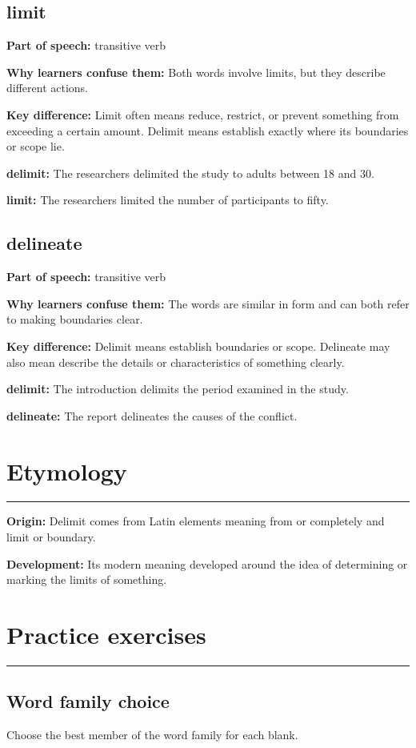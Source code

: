 \documentclass[11pt]{article}
\newcommand{\sectionrule}{\par\vspace{-0.5em}\noindent\textcolor{Accent}{\rule{\linewidth}{0.6pt}}\par}
\begin{document}
\subsection{limit}
\textbf{Part of speech:} transitive verb

\textbf{Why learners confuse them:} Both words involve limits, but they describe different actions.

\textbf{Key difference:} Limit often means reduce, restrict, or prevent something from exceeding a certain amount. Delimit means establish exactly where its boundaries or scope lie.

\textbf{delimit:} The researchers delimited the study to adults between 18 and 30.

\textbf{limit:} The researchers limited the number of participants to fifty.

\subsection{delineate}
\textbf{Part of speech:} transitive verb

\textbf{Why learners confuse them:} The words are similar in form and can both refer to making boundaries clear.

\textbf{Key difference:} Delimit means establish boundaries or scope. Delineate may also mean describe the details or characteristics of something clearly.

\textbf{delimit:} The introduction delimits the period examined in the study.

\textbf{delineate:} The report delineates the causes of the conflict.

\section{Etymology}
\sectionrule
\textbf{Origin:} Delimit comes from Latin elements meaning from or completely and limit or boundary.

\textbf{Development:} Its modern meaning developed around the idea of determining or marking the limits of something.

\section{Practice exercises}
\sectionrule
\subsection{Word family choice}
Choose the best member of the word family for each blank.
\end{document}
